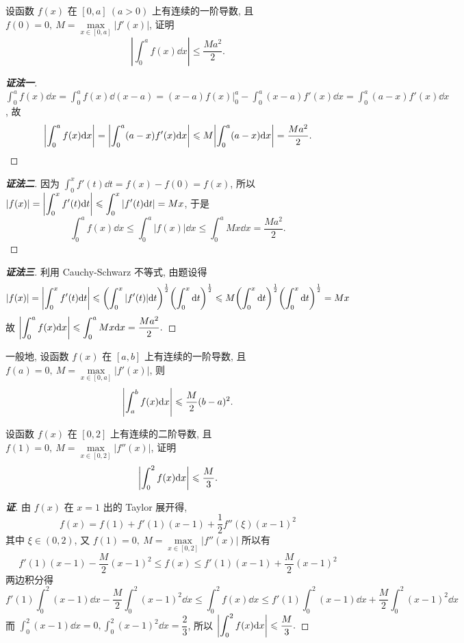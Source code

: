 \begin{example}
    设函数 $f(x)$ 在 $[0,a]~(a>0)$ 上有连续的一阶导数, 且 $f(0)=0,~M=\max\limits_{x\in[0,a]}|f'(x)|$, 证明 $$\displaystyle\left|\int_{0}^{a}f(x)\dd x \right|\leqslant \dfrac{Ma^2}{2}.$$
\end{example}
\begin{proof}[{\songti \textbf{证法一}}]
    $\displaystyle \int_{0}^{a}f(x)\dd x=\int_{0}^{a}f(x)\dd (x-a)=(x-a)f(x)\bigg |_0^a-\int_{0}^{a}(x-a)f'(x)\dd x=\int_{0}^{a}(a-x)f'(x)\dd x$,
    故 $$\displaystyle \qty|\int_{0}^{a}f(x)\dd x|=\qty|\int_{0}^{a}(a-x)f'(x)\dd x|\leqslant M\qty|\int_{0}^{a}(a-x)\dd x|=\dfrac{Ma^2}{2}.$$
\end{proof}
\begin{proof}[{\songti \textbf{证法二}}]
    因为 $\displaystyle\int_{0}^{x}f'(t)\dd t=f(x)-f(0)=f(x)$, 所以
    $\displaystyle |f(x)|=\qty|\int_{0}^{x}f'(t)\dd t |\leqslant \int_{0}^{x}|f'(t)\dd t |=Mx$, 于是
    $$\displaystyle\int_{0}^{a}f(x)\dd x\leqslant \int_{0}^{a}|f(x) |\dd x\leqslant \int_{0}^{a}Mx\dd x=\dfrac{Ma^2}{2}.$$
\end{proof}
\begin{proof}[{\songti \textbf{证法三}}]
    利用 Cauchy-Schwarz 不等式, 由题设得
    $$|f(x) |=\qty|\int_{0}^{x}f'(t)\dd t |\leqslant \qty(\int_{0}^{x}|f'(t)|\dd t)^{\frac{1}{2}}\qty(\int_{0}^{x}\dd t)^{\frac{1}{2}}\leqslant M\qty(\int_{0}^{x}\dd t)^{\frac{1}{2}}\qty(\int_{0}^{x}\dd t)^{\frac{1}{2}}=Mx$$
    故 $\displaystyle \qty|\int_{0}^{a}f(x)\dd x |\leqslant \int_{0}^{a}Mx\dd x=\dfrac{Ma^2}{2}.$
\end{proof}
\begin{inference}
    一般地, 设函数 $f(x)$ 在 $[a,b]$ 上有连续的一阶导数, 且 $f(a)=0,~M=\max\limits_{x\in[0,a]}|f'(x)|$, 则
    $$\displaystyle\qty|\int_{a}^{b}f(x)\dd x |\leqslant \dfrac{M}{2}(b-a)^2.$$
\end{inference}

\begin{example}
    设函数 $f(x)$ 在 $[0,2]$ 上有连续的二阶导数, 且 $f(1)=0,~M=\max\limits_{x\in[0,2]}|f''(x)|$, 证明
    $$\qty|\int_{0}^{2}f(x)\dd x|\leqslant \dfrac{M}{3}.$$
\end{example}
\begin{proof}[{\songti \textbf{证}}]
    由 $f(x)$ 在 $x=1$ 出的 Taylor 展开得,
    $$f(x)=f(1)+f'(1)(x-1)+\dfrac{1}{2}f''(\xi)(x-1)^2$$
    其中 $\xi\in(0,2)$, 又 $f(1)=0,~M=\max\limits_{x\in[0,2]}|f''(x)|$ 所以有
    $$f'(1)(x-1)-\dfrac{M}{2}(x-1)^2\leqslant f(x)\leqslant f'(1)(x-1)+\dfrac{M}{2}(x-1)^2$$
    两边积分得 $$f'(1)\int_{0}^{2}(x-1)\dd x-\dfrac{M}{2}\int_{0}^{2}(x-1)^2\dd x\leqslant \int_{0}^{2}f(x)\dd x\leqslant f'(1)\int_{0}^{2}(x-1)\dd x+\dfrac{M}{2}\int_{0}^{2}(x-1)^2\dd x$$
    而 $\displaystyle\int_{0}^{2}(x-1)\dd x=0,\int_{0}^{2}(x-1)^2\dd x=\dfrac{2}{3}$, 所以 $\displaystyle\qty|\int_{0}^{2}f(x)\dd x|\leqslant \dfrac{M}{3}.$
\end{proof}

